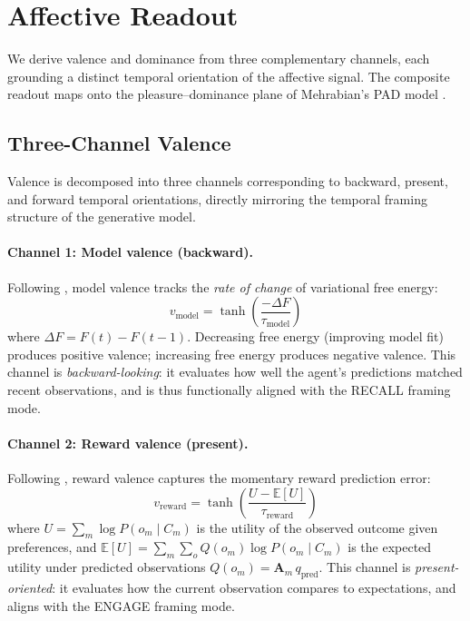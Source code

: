 \documentclass[11pt,a4paper]{article}
\begin{document}
\section{Affective Readout}\label{sec:affect}

We derive valence and dominance from three complementary channels, each grounding a distinct temporal orientation of the affective signal. The composite readout maps onto the pleasure--dominance plane of Mehrabian's PAD model \citep{mehrabian1996pleasure}.

\subsection{Three-Channel Valence}

Valence is decomposed into three channels corresponding to backward, present, and forward temporal orientations, directly mirroring the temporal framing structure of the generative model.

\paragraph{Channel 1: Model valence (backward).}
Following \citet{joffily2013emotional}, model valence tracks the \emph{rate of change} of variational free energy:
\begin{equation}
    v_{\text{model}} = \tanh\!\left(\frac{-\Delta F}{\tau_{\text{model}}}\right)
\end{equation}
where $\Delta F = F(t) - F(t{-}1)$. Decreasing free energy (improving model fit) produces positive valence; increasing free energy produces negative valence. This channel is \emph{backward-looking}: it evaluates how well the agent's predictions matched recent observations, and is thus functionally aligned with the RECALL framing mode.

\paragraph{Channel 2: Reward valence (present).}
Following \citet{pattisapu2024free}, reward valence captures the momentary reward prediction error:
\begin{equation}
    v_{\text{reward}} = \tanh\!\left(\frac{U - \mathbb{E}[U]}{\tau_{\text{reward}}}\right)
\end{equation}
where $U = \sum_m \log P(o_m \mid C_m)$ is the utility of the observed outcome given preferences, and $\mathbb{E}[U] = \sum_m \sum_{o} Q(o_m) \log P(o_m \mid C_m)$ is the expected utility under predicted observations $Q(o_m) = \mathbf{A}_m \, q_{\text{pred}}$. This channel is \emph{present-oriented}: it evaluates how the current observation compares to expectations, and aligns with the ENGAGE framing mode.
\end{document}

